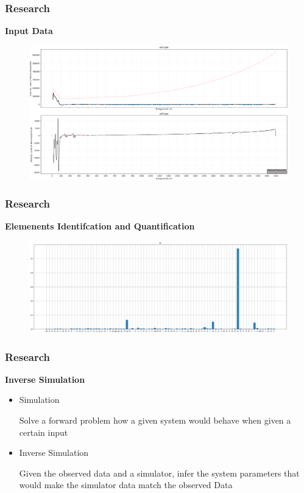 \documentclass{beamer}              %
\begin{document}

\begin{frame}
\frametitle{Research}
  \textbf{Input Data}
      \begin{figure}
        \includegraphics[width=1\textwidth]{specs.png}
      \end{figure}
\end{frame}


\begin{frame}
\frametitle{Research}
  \textbf{Elemenents Identifcation and Quantification}
      \begin{figure}
        \includegraphics[width=\textwidth,keepaspectratio]{auger_peaks.png}
      \end{figure}
\end{frame}



\begin{frame}
\frametitle{Research}
      \textbf{Inverse Simulation}
      \begin{itemize}
        \item<1-> Simulation 

          Solve a forward problem how a given system would behave when given a
          certain input

        \item<2-> Inverse Simulation

          Given the observed data and a simulator, infer the system parameters
          that would make the simulator data match the observed Data

      \end{itemize}
\end{frame}
\end{document}
